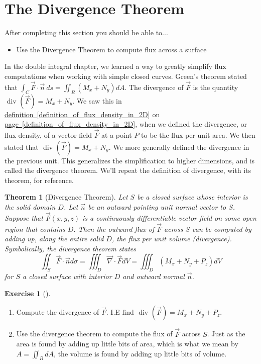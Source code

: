 \documentclass[10pt,]{book}
\theoremstyle{plain}
\newtheorem{theorem}{Theorem}[section]
\theoremstyle{definition}
\theoremstyle{definition}
\theoremstyle{definition}
\theoremstyle{definition}
\newtheorem{exploration}[project]{Exercise}
\theoremstyle{definition}
\numberwithin{equation}{section}
\begin{document}
\section[{The Divergence Theorem}]{The Divergence Theorem}\label{section-47}
After completing this section you should be able to... \leavevmode%
\begin{itemize}[label=\textbullet]
\item{}Use the Divergence Theorem to compute flux across a surface%
\end{itemize}
%
\par
In the double integral chapter, we learned a way to greatly simplify flux computations when working with simple closed curves. Green's theorem stated that \(\int_C \vec F\cdot \vec n\ ds = \iint_R (M_x+N_y) dA\). The divergence of \(\vec F\) is the quantity \(\text{ div } (\vec F) = M_x+N_y\). We saw this in \hyperref[definition_of_flux_density_in_2D]{definition~\ref{definition_of_flux_density_in_2D}} on \hyperref[definition_of_flux_density_in_2D]{page~\ref{definition_of_flux_density_in_2D}}, when we defined the divergence, or flux density, of a vector field \(\vec F\) at a point \(P\) to be the flux per unit area. We then stated that \(\text{ div } (\vec F)=M_x+N_y\). We more generally defined the divergence in the previous unit. This generalizes the simplification to higher dimensions, and is called the divergence theorem. We'll repeat the definition of divergence, with its theorem, for reference.%
\begin{theorem}[{Divergence Theorem}]\label{theorem-15}
Let \(S\) be a closed surface whose interior is the solid domain \(D\). Let \(\vec n\) be an outward pointing unit normal vector to \(S\). Suppose that \(\vec F(x,y,z)\) is a continuously differentiable vector field on some open region that contains \(D\). Then the outward flux of \(\vec F\) across \(S\) can be computed by adding up, along the entire solid \(D\), the flux per unit volume (divergence). Symbolically, the divergence theorem states%
\begin{equation*}
\iint_S\vec F\cdot \vec n d\sigma =  \iiint_D \vec \nabla \cdot \vec F dV = \iiint_D \left(M_x+N_y+P_z\right) dV
\end{equation*}
for \(S\) a closed surface with interior \(D\) and outward normal \(\vec n\).%
\end{theorem}
\begin{exploration}[]\label{exploration-310}
\leavevmode%
\begin{enumerate}[font=\bfseries,label=(\alph*),ref=\alph*]
\item\label{task-839} Compute the divergence of \(\vec F\). I.E find \(\text{ div } (\vec F) = M_x+N_y+P_z\).%
\item\label{task-840} Use the divergence theorem to compute the flux of \(\vec F\) across \(S\). Just as the area is found by adding up little bits of area, which is what we mean by \(A=\iint_R dA\), the volume is found by adding up little bits of volume.%
%
\end{enumerate}
\end{exploration}
\end{document}
